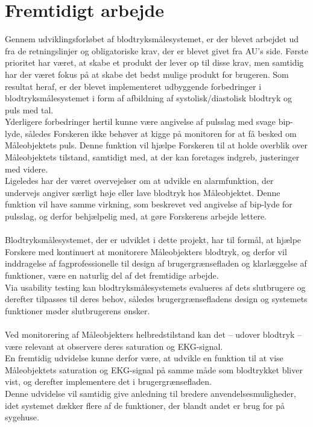 \section{Fremtidigt arbejde}
Gennem udviklingsforløbet af blodtryksmålesystemet, er der blevet arbejdet ud fra de retningslinjer og obligatoriske krav, der er blevet givet fra AU’s side. Første prioritet har været, at skabe et produkt der lever op til disse krav, men samtidig har der været fokus på at skabe det bedst mulige produkt for brugeren. Som resultat heraf, er der blevet implementeret udbyggende forbedringer i blodtryksmålesystemet i form af afbildning af systolisk/diastolisk blodtryk og puls med tal. \\
Yderligere forbedringer hertil kunne være angivelse af pulsslag med svage bip-lyde, således Forskeren ikke behøver at kigge på monitoren for at få besked om Måleobjektets puls. Denne funktion vil hjælpe Forskeren til at holde overblik over Måleobjektets tilstand, samtidigt med, at der kan foretages indgreb, justeringer med videre. \\
Ligeledes har der været overvejelser om at udvikle en alarmfunktion, der undervejs angiver særligt høje eller lave blodtryk hos Måleobjektet.  Denne funktion vil have samme virkning, som beskrevet ved angivelse af bip-lyde for pulsslag, og derfor behjælpelig med, at gøre Forskerens arbejde lettere. \\ \\

Blodtryksmålesystemet, der er udviklet i dette projekt, har til formål, at hjælpe Forskere med kontinuert at monitorere Måleobjekters blodtryk, og derfor vil inddragelse af fagprofessionelle til design af brugergrænsefladen og klarlæggelse af funktioner, være en naturlig del af det fremtidige arbejde. \\
Via usability testing kan blodtryksmålesystemets evalueres af dets slutbrugere og derefter tilpasses til deres behov, således brugergrænsefladens design og systemets funktioner møder slutbrugerens ønsker. \\ \\

Ved monitorering af Måleobjekters helbredstilstand kan det – udover blodtryk – være relevant at observere deres saturation og EKG-signal. \\ 
En fremtidig udvidelse kunne derfor være, at udvikle en funktion til at vise Måleobjektets saturation og EKG-signal på samme måde som blodtrykket bliver vist, og derefter implementere det i brugergrænsefladen. \\
Denne udvidelse vil samtidig give anledning til bredere anvendelsesmuligheder, idet systemet dækker flere af de funktioner, der blandt andet er brug for på sygehuse. \\ \\

